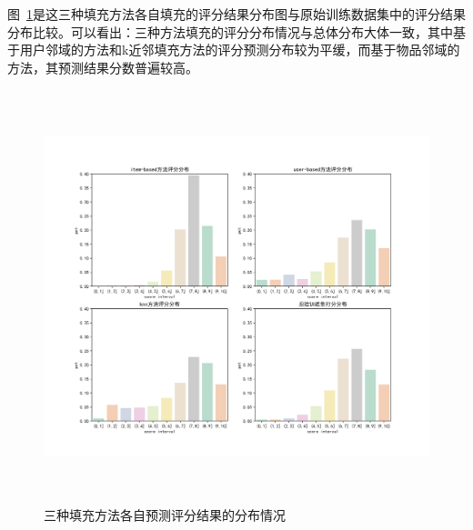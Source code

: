 图~\ref{fig: pred_score_distribution}是这三种填充方法各自填充的评分结果分布图与原始训练数据集中的评分结果分布比较。可以看出：三种方法填充的评分分布情况与总体分布大体一致，其中基于用户邻域的方法和k近邻填充方法的评分预测分布较为平缓，而基于物品邻域的方法，其预测结果分数普遍较高。
\begin{figure}[htbp]
	\centering
	\includegraphics[height=12.0cm,width=16.0cm]{figure/pred_score.png}
	\caption{三种填充方法各自预测评分结果的分布情况}
	\label{fig: pred_score_distribution}
\end{figure}

